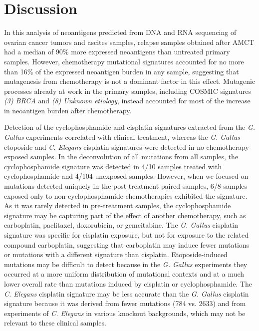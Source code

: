 \section*{Discussion}
In this analysis of neoantigens predicted from DNA and RNA sequencing of ovarian cancer tumors and ascites samples, relapse samples obtained after AMCT had a median of 90\% more expressed neoantigens than untreated primary samples. However, chemotherapy mutational signatures accounted for no more than 16\% of the expressed neoantigen burden in any sample, suggesting that mutagenesis from chemotherapy is not a dominant factor in this effect. Mutagenic processes already at work in the primary samples, including COSMIC signatures \textit{(3) BRCA} and \textit{(8) Unknown etiology}, instead accounted for most of the increase in neoantigen burden after chemotherapy.

Detection of the cyclophosphamide and cisplatin signatures extracted from the \textit{G. Gallus} experiments correlated with clinical treatment, whereas the \textit{G. Gallus} etoposide and \textit{C. Elegans} cisplatin signatures were detected in no chemotherapy-exposed samples. In the deconvolution of all mutations from all samples, the cyclophosphamide signature was detected in 4/10 samples treated with cyclophosphamide and 4/104 unexposed samples. However, when we focused on mutations detected uniquely in the post-treatment paired samples, 6/8 samples exposed only to non-cyclophosphamide chemotherapies exhibited the signature. As it was rarely detected in pre-treatment samples, the cyclophosphamide signature may be capturing part of the effect of another chemotherapy, such as carboplatin, paclitaxel, doxorubicin, or gemcitabine. The \textit{G. Gallus} cisplatin signature was specific for cisplatin exposure, but not for exposure to the related compound carboplatin, suggesting that carboplatin may induce fewer mutations or mutations with a different signature than cisplatin. Etoposide-induced mutations may be difficult to detect because in the \textit{G. Gallus} experiments they occurred at a more uniform distribution of mutational contexts and at a much lower overall rate than mutations induced by cisplatin or cyclophosphamide. The \textit{C. Elegans} cisplatin signature may be less accurate than the \textit{G. Gallus} cisplatin signature because it was derived from fewer mutations (784 vs. 2633) and from experiments of \textit{C. Elegans} in various knockout backgrounds, which may not be relevant to these clinical samples.

